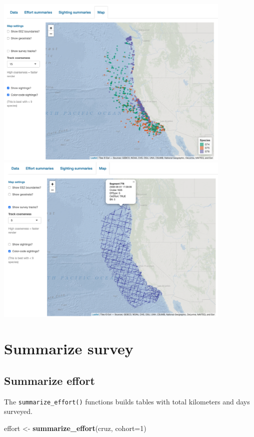 \documentclass[
]{book}
\newenvironment{Shaded}{\begin{snugshade}}{\end{snugshade}}
\newcommand{\DataTypeTok}[1]{\textcolor[rgb]{0.13,0.29,0.53}{#1}}
\newcommand{\DecValTok}[1]{\textcolor[rgb]{0.00,0.00,0.81}{#1}}
\newcommand{\KeywordTok}[1]{\textcolor[rgb]{0.13,0.29,0.53}{\textbf{#1}}}
\newcommand{\NormalTok}[1]{#1}
\newcommand{\StringTok}[1]{\textcolor[rgb]{0.31,0.60,0.02}{#1}}
\begin{document}
~\\
\includegraphics[width=0.85\textwidth,height=\textheight]{img/app-4.png}
~\\
\includegraphics[width=0.85\textwidth,height=\textheight]{img/app-5.png}

\hypertarget{summarize}{%
\chapter{Summarize survey}\label{summarize}}

\hypertarget{summarize-effort}{%
\section*{Summarize effort}\label{summarize-effort}}

The \texttt{summarize\_effort()} functions builds tables with total kilometers and days surveyed.

\begin{Shaded}
\begin{Highlighting}[]
\NormalTok{effort <-}\StringTok{ }\KeywordTok{summarize_effort}\NormalTok{(cruz,}
                           \DataTypeTok{cohort=}\DecValTok{1}\NormalTok{)}
\end{Highlighting}
\end{Shaded}
\end{document}
